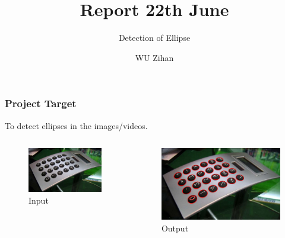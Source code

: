 \documentclass{beamer}
\title{Report 22th June}
\author{WU Zihan}
\subtitle{Detection of Ellipse}
\begin{document}
    \maketitle

    \begin{frame}
        \frametitle{Project Target}
    
        To detect ellipses in the images/videos.
        \begin{columns}
            \begin{column}{.5\linewidth}
                \begin{figure}
                    \includegraphics[width=0.8\linewidth]{pic/source.jpg}
                    \caption{Input}
                \end{figure}
            \end{column}
            \begin{column}{.5\linewidth}
                \begin{figure}
                    \includegraphics[width=0.8\linewidth]{pic/ideaoutput.jpg}
                    \caption{Output}
                \end{figure}
            \end{column}
        \end{columns}
    
    \end{frame}
\end{document}

